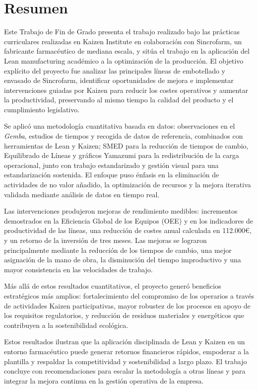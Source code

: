 \documentclass[]{article}
\begin{document}
\section*{Resumen}\label{resumen}
Este Trabajo de Fin de Grado presenta el trabajo realizado bajo las prácticas curriculares realizadas en Kaizen Institute en colaboración con Sincrofarm, un fabricante farmacéutico de mediana escala, y sitúa el trabajo en la aplicación del Lean manufacturing académico a la optimización de la producción. El objetivo explícito del proyecto fue analizar las principales líneas de embotellado y envasado de Sincrofarm, identificar oportunidades de mejora e implementar intervenciones guiadas por Kaizen para reducir los costes operativos y aumentar la productividad, preservando al mismo tiempo la calidad del producto y el cumplimiento legislativo.

Se aplicó una metodología cuantitativa basada en datos: observaciones en el \textit{Gemba}, estudios de tiempos y recogida de datos de referencia, combinados con herramientas de Lean y Kaizen; SMED para la reducción de tiempos de cambio, Equilibrado de Líneas y gráficos Yamazumi para la redistribución de la carga operacional, junto con trabajo estandarizado y gestión visual para una estandarización sostenida. El enfoque puso énfasis en la eliminación de actividades de no valor añadido, la optimización de recursos y la mejora iterativa validada mediante análisis de datos en tiempo real.

Las intervenciones produjeron mejoras de rendimiento medibles: incrementos demostrados en la Eficiencia Global de los Equipos (OEE) y en los indicadores de productividad de las líneas, una reducción de costes anual calculada en 112.000\euro, y un retorno de la inversión de tres meses. Las mejoras se lograron principalmente mediante la reducción de los tiempos de cambio, una mejor asignación de la mano de obra, la disminución del tiempo improductivo y una mayor consistencia en las velocidades de trabajo.

Más allá de estos resultados cuantitativos, el proyecto generó beneficios estratégicos más amplios: fortalecimiento del compromiso de los operarios a través de actividades Kaizen participativas, mayor robustez de los procesos en apoyo de los requisitos regulatorios, y reducción de residuos materiales y energéticos que contribuyen a la sostenibilidad ecológica.

Estos resultados ilustran que la aplicación disciplinada de Lean y Kaizen en un entorno farmacéutico puede generar retornos financieros rápidos, empoderar a la plantilla y respaldar la competitividad y sostenibilidad a largo plazo. El trabajo concluye con recomendaciones para escalar la metodología a otras líneas y para integrar la mejora continua en la gestión operativa de la empresa.
\newpage
\end{document}
